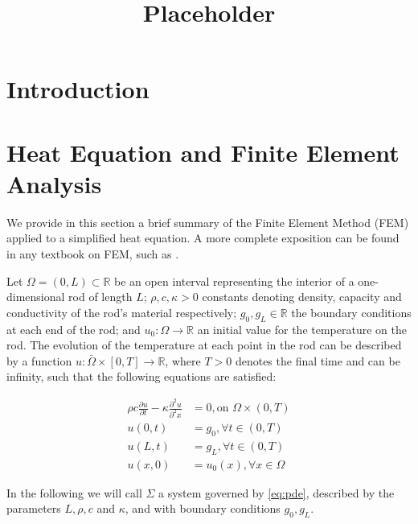 \documentclass[oribibl]{llncs/llncs}
\title{Placeholder}
\newcommand*{\R}{\mathbb{R}}
\begin{document}
\maketitle

\begin{abstract}
    
\end{abstract}

\section{Introduction}
\label{sec:introduction}


\section{Heat Equation and Finite Element Analysis}
\label{sec:heat_equation_and_finite_element_analysis}

We provide in this section a brief summary of the Finite Element Method (FEM) applied
to a simplified heat equation. A more complete exposition can be found in any
textbook on FEM, such as \cite{}.

Let $\Omega = (0, L) \subset \R$ be an open interval representing the interior
of a one-dimensional rod of length $L$; $\rho, c, \kappa > 0$ 
constants denoting density, capacity and conductivity of the rod's material respectively;
$g_0, g_L \in \R$ the boundary conditions at each end of the rod; and $u_0 :
\Omega \rightarrow \R$ an initial value for the temperature on the rod. 
The evolution of the temperature at
each point in the rod can be described by a function $u : \bar \Omega \times [0,
T] \rightarrow \R$, where $T > 0$ denotes the final time and can be infinity, 
such that the following equations are satisfied:

\begin{equation}\label{eq:pde}
    \begin{aligned}
        \rho c \frac{\partial u}{\partial t} - \kappa \frac{\partial^2
        u}{\partial^2 x} &= 0, \text{on } \Omega \times (0, T) \\
        u(0, t) &= g_0, \forall t \in (0, T) \\
        u(L, t) &= g_L, \forall t \in (0, T) \\
        u(x, 0) &= u_0(x), \forall x \in \Omega
    \end{aligned}
\end{equation}

In the following we will call $\Sigma$ a system governed by \cref{eq:pde},
described by the parameters $L, \rho, c$ and $\kappa$, and with boundary
conditions $g_0, g_L$.
\end{document}
